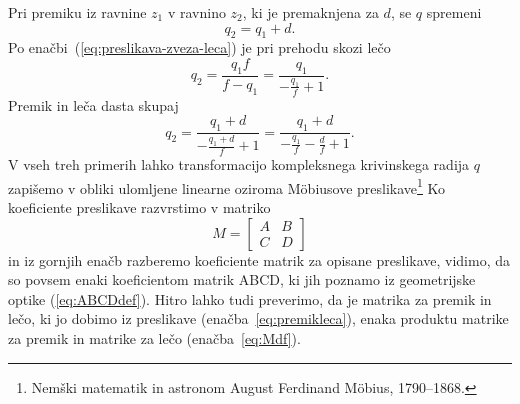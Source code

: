 Pri premiku iz ravnine $z_1$ v ravnino $z_2$, ki je premaknjena
za $d$, se $q$ spremeni 
\begin{equation}
q_2=q_1+d.
\end{equation}
Po enačbi~(\ref{eq:preslikava-zveza-leca}) je pri prehodu skozi lečo
\begin{equation}
q_2=\frac{q_1f}{f-q_1}=\frac{q_1}{-\frac{q_1}{f}+1}.
\end{equation}
Premik in leča dasta skupaj
\begin{equation}
q_2=\frac{q_1+d}{-\frac{q_1+d}{f}+1}=\frac{q_1+d}{-\frac{q_1}{f}-\frac{d}{f}+1}.
\label{eq:premikleca}
\end{equation}
V vseh treh primerih lahko transformacijo kompleksnega krivinskega radija 
$q$ zapišemo v obliki ulomljene linearne oziroma M\"obiusove 
preslikave\footnote{Nemški matematik in astronom August Ferdinand M\"obius, 1790--1868.}
Ko koeficiente preslikave razvrstimo v matriko 
\begin{equation}
M= \left[\begin{array}{cc}
A & B\\
C & D
\end{array}\right]
\end{equation}
in iz gornjih enačb razberemo koeficiente matrik  za opisane 
preslikave, vidimo, da so povsem enaki koeficientom matrik ABCD, ki jih poznamo iz
geometrijske optike (\ref{eq:ABCDdef}). Hitro lahko tudi preverimo, 
da je matrika za premik in lečo, ki jo dobimo iz preslikave (enačba~\ref{eq:premikleca}),
enaka produktu matrike za premik in matrike za lečo
(enačba~\ref{eq:Mdf}). 

